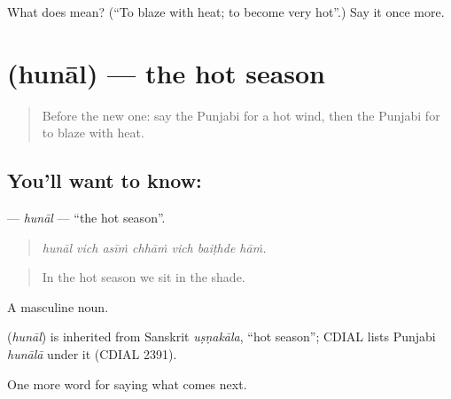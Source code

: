 \begin{tcolorbox}[breakable,colback=teal!4,colframe=teal!35!black,title={Before you move on}]
What does  mean? (\textquotedblleft{}To blaze with heat; to become very hot\textquotedblright{}.) Say it once more.
\end{tcolorbox}
\section[\texorpdfstring{\pa{ਹੁਨਾਲ} (hunāl)}{ਹੁਨਾਲ (hunāl)}]{ (hunāl) — the hot season}

\label{lesson:PA-C288-hunal}



\begin{quote}
Before the new one: say the Punjabi for a hot wind, then the Punjabi for to blaze with heat.
\end{quote}

\subsection*{You'll want to know: }
\textbf{} — \emph{hunāl} — \textquotedblleft{}the hot season\textquotedblright{}.

\begin{quote}
      
\end{quote}

\begin{quote}
\emph{hunāl vich asīṁ chhāṁ vich baiṭhde hāṁ.}
\end{quote}

\begin{quote}
In the hot season we sit in the shade.
\end{quote}

A masculine noun.

\begin{cousinweb}
\textbf{} (\emph{hunāl}) is inherited from Sanskrit \emph{uṣṇakāla}, \textquotedblleft{}hot season\textquotedblright{}; CDIAL lists Punjabi \emph{hunālā} under it (CDIAL 2391).
\end{cousinweb}

\begin{grammarlens}[title={What you've built}]
One more word for saying what comes next.
\end{grammarlens}

